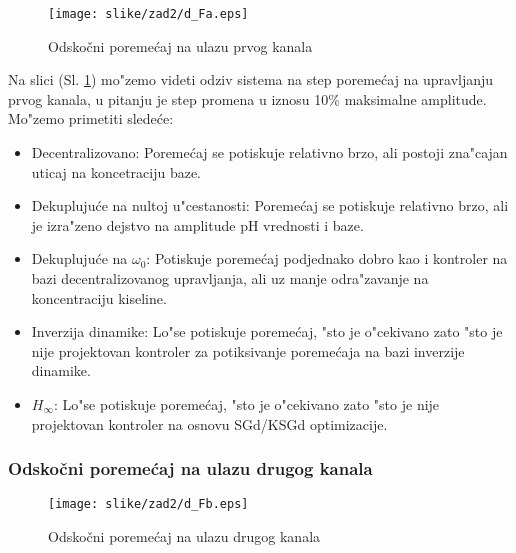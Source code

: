 \documentclass[a4paper,11pt]{article}
\theoremstyle{definition} \newtheorem{deff}{Definicija}[section]
\theoremstyle{definition} \newtheorem{prim}[deff]{Primer}
\theoremstyle{plain} \newtheorem{teor}[deff]{Teorema}
\begin{document}
			\begin{figure}[!ht]
				\centering
				\texttt{[image: slike/zad2/d\_Fa.eps]}
				\caption{Odskočni poremećaj na ulazu prvog kanala}
				\label{fig:d_Fa}
			\end{figure}
			\vspace{1cm}
			Na slici (Sl. \ref{fig:d_Fa}) mo"zemo videti odziv sistema na step poreme\'caj na upravljanju prvog kanala, u pitanju je step promena u iznosu 10\% maksimalne amplitude. Mo"zemo primetiti slede\'ce:
			\begin{itemize}
				\item Decentralizovano: Poreme\'caj se potiskuje relativno brzo, ali postoji zna"cajan uticaj na koncetraciju baze.
				
				\item Dekupluju\'ce na nultoj u"cestanosti: Poreme\'caj se potiskuje relativno brzo, ali je izra"zeno dejstvo na amplitude pH vrednosti i baze.
				
				\item Dekupluju\'ce na $\omega_0$: Potiskuje poreme\'caj podjednako dobro kao i kontroler na bazi decentralizovanog upravljanja, ali uz manje odra"zavanje na koncentraciju kiseline.
				
				\item Inverzija dinamike: Lo"se potiskuje poreme\'caj, "sto je o"cekivano zato "sto je nije projektovan kontroler za potiksivanje poreme\'caja na bazi inverzije dinamike.
				
				\item $H_{\infty}$: Lo"se potiskuje poreme\'caj, "sto je o"cekivano zato "sto je nije projektovan kontroler na osnovu SGd/KSGd optimizacije.
				
			\end{itemize}
			
			\clearpage
			
			\subsubsection{Odskočni poremećaj na ulazu drugog kanala}
			
			\begin{figure}[!ht]
				\centering
				\texttt{[image: slike/zad2/d\_Fb.eps]}
				\caption{Odskočni poremećaj na ulazu drugog kanala}
				\label{fig:d_Fb}
			\end{figure}
			
\end{document}
